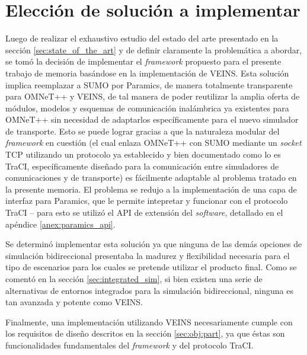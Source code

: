 \section{Elección de solución a implementar}\label{sec:solution}

Luego de realizar el exhaustivo estudio del estado del arte presentado en la sección \ref{sec:state_of_the_art} y de definir claramente la problemática a abordar, se tomó la decisión de implementar el \emph{framework} propuesto para el presente trabajo de memoria basándose en la implementación de VEINS. Esta solución implica reemplazar a SUMO por Paramics, de manera totalmente transparente para OMNeT++ y VEINS, de tal manera de poder reutilizar la amplia oferta de módulos, modelos y esquemas de comunicación inalámbrica ya existentes para OMNeT++ sin necesidad de adaptarlos específicamente para el nuevo simulador de transporte. 
Esto se puede lograr gracias a que la naturaleza modular del \emph{framework} en cuestión (el cual enlaza OMNeT++ con SUMO mediante un \emph{socket} TCP utilizando un protocolo ya establecido y bien documentado como lo es TraCI, específicamente diseñado para la comunicación entre simuladores de comunicaciones y de transporte) es fácilmente adaptable al problema tratado en la presente memoria. 
El problema se redujo a la implementación de una capa de interfaz para Paramics, que le permite intepretar y funcionar con el protocolo TraCI -- para esto se utilizó el API de extensión del \emph{software}, detallado en el apéndice \ref{anex:paramics_api}.

Se determinó implementar esta solución ya que ninguna de las demás opciones de simulación bidireccional presentaba la madurez y flexibilidad necesaria para el tipo de escenarios para los cuales se pretende utilizar el producto final. Como se comentó en la sección \ref{sec:integrated_sim}, si bien existen una serie de alternativas de entornos integrados para la simulación bidireccional, ninguna es tan avanzada y potente como VEINS.

Finalmente, una implementación utilizando VEINS necesariamente cumple con los requisitos de diseño descritos en la sección \ref{sec:obj:part}, ya que éstas son funcionalidades fundamentales del \emph{framework} y del protocolo TraCI.
